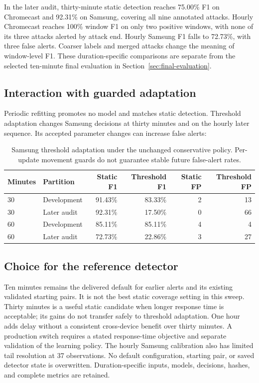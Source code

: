 In the later audit, thirty-minute static detection reaches 75.00\% F1 on
Chromecast and 92.31\% on Samsung, covering all nine annotated attacks.
Hourly Chromecast reaches 100\% window F1 on only two positive windows, with
none of its three attacks alerted by attack end. Hourly Samsung F1 falls to
72.73\%, with three false alerts. Coarser labels and merged attacks change the
meaning of window-level F1. These duration-specific comparisons are separate
from the selected ten-minute final evaluation in Section~\ref{sec:final-evaluation}.

\subsection{Interaction with guarded adaptation}

Periodic refitting promotes no model and matches static detection. Threshold
adaptation changes Samsung decisions at thirty minutes and on the hourly
later sequence. Its accepted parameter changes can increase false alerts:

\begin{table}[H]
\centering\small
\begin{tabular}{llrrrr}
\toprule
\textbf{Minutes} & \textbf{Partition} & \textbf{Static F1} & \textbf{Threshold F1} &
\textbf{Static FP} & \textbf{Threshold FP} \\
\midrule
30 & Development & 91.43\% & 83.33\% & 2 & 13 \\
30 & Later audit & 92.31\% & 17.50\% & 0 & 66 \\
60 & Development & 85.11\% & 85.11\% & 4 & 4 \\
60 & Later audit & 72.73\% & 22.86\% & 3 & 27 \\
\bottomrule
\end{tabular}
\caption{Samsung threshold adaptation under the unchanged conservative policy.
Per-update movement guards do not guarantee stable future false-alert rates.}
\label{tab:window-duration-adaptation}
\end{table}

\subsection{Choice for the reference detector}

Ten minutes remains the delivered default for earlier alerts and its existing
validated starting pairs. It is not the best static coverage setting in this
sweep. Thirty minutes is a useful static candidate when longer response time
is acceptable; its gains do not transfer safely to threshold adaptation.
One hour adds delay without a consistent cross-device benefit over thirty
minutes. A production switch requires a stated response-time objective and
separate validation of the learning policy. The hourly Samsung calibration
also has limited tail resolution at 37 observations. No default configuration,
starting pair, or saved detector state is overwritten. Duration-specific
inputs, models, decisions, hashes, and complete metrics are retained.
